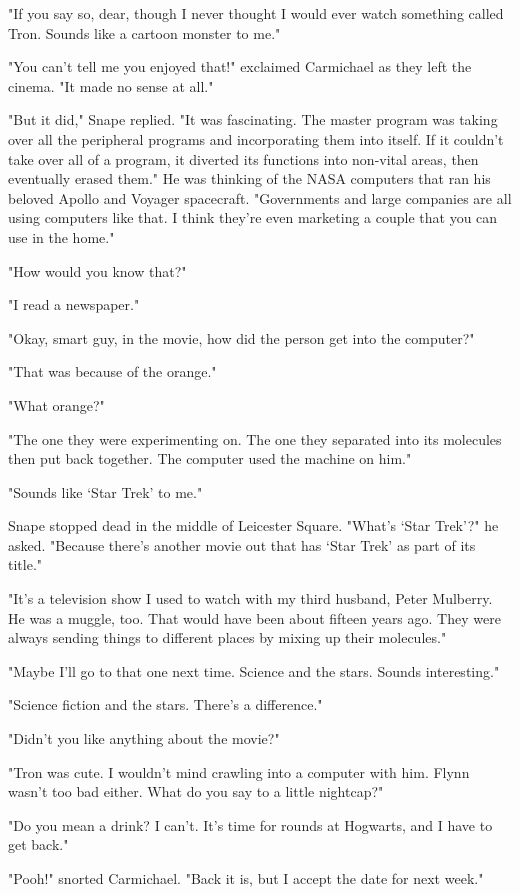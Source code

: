 "If you say so, dear, though I never thought I would ever watch something called Tron. Sounds like a cartoon monster to me."

"You can't tell me you enjoyed that!" exclaimed Carmichael as they left the cinema. "It made no sense at all."

"But it did," Snape replied. "It was fascinating. The master program was taking over all the peripheral programs and incorporating them into itself. If it couldn't take over all of a program, it diverted its functions into non-vital areas, then eventually erased them." He was thinking of the NASA computers that ran his beloved Apollo and Voyager spacecraft. "Governments and large companies are all using computers like that. I think they're even marketing a couple that you can use in the home."

"How would you know that?"

"I read a newspaper."

"Okay, smart guy, in the movie, how did the person get into the computer?"

"That was because of the orange."

"What orange?"

"The one they were experimenting on. The one they separated into its molecules then put back together. The computer used the machine on him."

"Sounds like `Star Trek' to me."

Snape stopped dead in the middle of Leicester Square. "What's `Star Trek'?" he asked. "Because there's another movie out that has `Star Trek' as part of its title."

"It's a television show I used to watch with my third husband, Peter Mulberry. He was a muggle, too. That would have been about fifteen years ago. They were always sending things to different places by mixing up their molecules."

"Maybe I'll go to that one next time. Science and the stars. Sounds interesting."

"Science fiction and the stars. There's a difference."

"Didn't you like anything about the movie?"

"Tron was cute. I wouldn't mind crawling into a computer with him. Flynn wasn't too bad either. What do you say to a little nightcap?"

"Do you mean a drink? I can't. It's time for rounds at Hogwarts, and I have to get back."

"Pooh!" snorted Carmichael. "Back it is, but I accept the date for next week."


